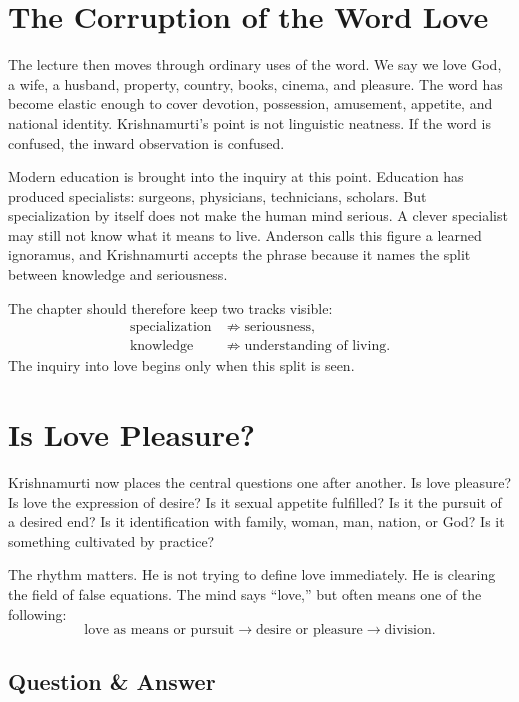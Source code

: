 \section{The Corruption of the Word Love}

The lecture then moves through ordinary uses of the word. We say we love God, a wife, a husband, property, country, books, cinema, and pleasure. The word has become elastic enough to cover devotion, possession, amusement, appetite, and national identity. Krishnamurti's point is not linguistic neatness. If the word is confused, the inward observation is confused.

Modern education is brought into the inquiry at this point. Education has produced specialists: surgeons, physicians, technicians, scholars. But specialization by itself does not make the human mind serious. A clever specialist may still not know what it means to live. Anderson calls this figure a learned ignoramus, and Krishnamurti accepts the phrase because it names the split between knowledge and seriousness.

The chapter should therefore keep two tracks visible:
\begin{align}
\text{specialization} &\not\Longrightarrow \text{seriousness},\\
\text{knowledge} &\not\Longrightarrow \text{understanding of living}.
\end{align}
The inquiry into love begins only when this split is seen.

\section{Is Love Pleasure?}

Krishnamurti now places the central questions one after another. Is love pleasure? Is love the expression of desire? Is it sexual appetite fulfilled? Is it the pursuit of a desired end? Is it identification with family, woman, man, nation, or God? Is it something cultivated by practice?

The rhythm matters. He is not trying to define love immediately. He is clearing the field of false equations. The mind says ``love,'' but often means one of the following:
\begin{equation}
\text{love as means or pursuit}
\longrightarrow
\text{desire or pleasure}
\longrightarrow
\text{division}.
\end{equation}

\subsection{Question \& Answer}

